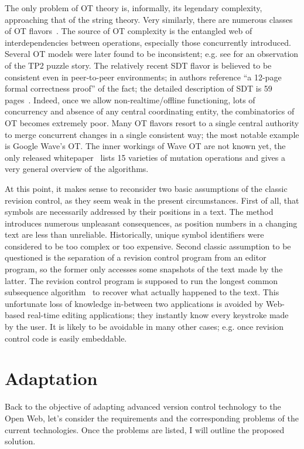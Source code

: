 \documentclass{acm_proc_article-sp}
\begin{document}
The only problem of OT theory is, informally, its legendary
complexity, approaching that of the string theory.
Very similarly, there are numerous classes of OT flavors~\cite{ot}.
The source of OT complexity is the entangled web of interdependencies
between operations, especially those concurrently introduced.
Several OT models were later found to be inconsistent;
e.g. see \cite{woot} for an observation of the TP2 puzzle story.
The relatively recent SDT flavor is
believed to be consistent even in peer-to-peer environments;
in \cite{lili-preserving} authors reference ``a 12-page formal
correctness proof'' of the fact; the detailed description of
SDT is 59 pages~\cite{lili-ensuring}.
Indeed, once we allow non-realtime/offline functioning,
lots of concurrency and absence of any central coordinating entity,
the combinatorics of OT becomes extremely poor.
Many OT flavors resort to a single central authority to
merge concurrent changes in a single consistent way;
the most notable example is Google Wave's OT.
The inner workings of Wave OT are
not known yet, the only released whitepaper~\cite{waveot}
lists 15 varieties of mutation operations and gives a very
general overview of the algorithms.

At this point, it makes sense to reconsider two basic
assumptions of the classic revision control, as they seem weak
in the present circumstances. First of all, that symbols are
necessarily
addressed by their positions in a text. The method introduces
numerous unpleasant consequences, as position numbers
in a changing text are less than unreliable. 
Historically, unique symbol identifiers were
considered to be too complex or too expensive.
Second classic assumption to be questioned is the
separation of a revision control program from an
editor program, so the former only accesses some snapshots
of the text made by the latter.
The revision control program is supposed to
run the longest common subsequence algorithm~\cite{lcs-algo} to
recover what actually happened to the text.
This unfortunate loss of knowledge in-between two
applications is avoided by Web-based real-time editing
applications; they instantly know
every keystroke made by the user.
It is likely to be avoidable in many other cases;
e.g. once revision control code is easily embeddable.


\section {Adaptation}   \label{sec:textile}

Back to the objective of adapting advanced version
control technology to the Open Web, let's consider the
requirements and the corresponding problems of the
current technologies. Once the problems are listed, I
will outline the proposed solution.
\end{document}
